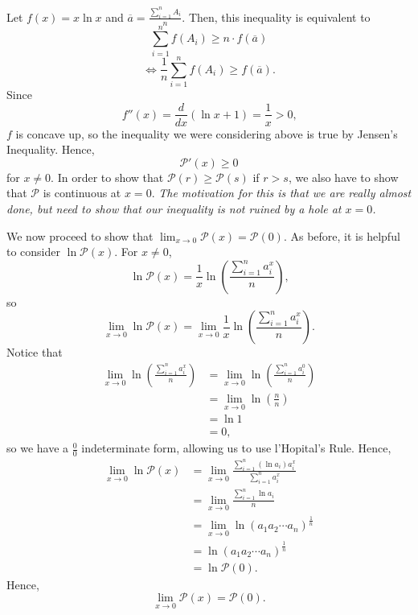 \documentclass{article}
\begin{document}
Let $f(x) = x \ln x$ and $\overline{a} = \frac{\sum_{i=1}^n A_i}{n}$. Then, this inequality is equivalent to
\[
\sum_{i=1}^n f(A_i) \geq n \cdot f(\overline{a})
\]
\[
    \iff \frac{1}{n} \sum_{i=1}^n f(A_i) \geq f(\overline{a}) \text{.}
\]
Since
\[
    f''(x) = \frac{d}{dx} (\ln x + 1) = \frac{1}{x} > 0 \text{,}
\]
$f$ is concave up, so the inequality we were considering above is true by Jensen's Inequality. Hence,
\[
    \mathcal{P}'(x) \geq 0
\]
for $x \neq 0$. In order to show that $\mathcal{P}(r) \geq \mathcal{P}(s)$ if $r > s$, we also have to show that $\mathcal{P}$ is continuous at $x = 0$. \textit{The motivation for this is that we are really almost done, but need to show that our inequality is not ruined by a hole at $x = 0$.}
\bigskip

We now proceed to show that $\lim_{x \rightarrow 0} \mathcal{P}(x) = \mathcal{P}(0)$. As before, it is helpful to consider $\ln \mathcal{P}(x)$. For $x \neq 0$,
\[
    \ln \mathcal{P}(x) = \frac{1}{x} \ln \left( \frac{\sum_{i=1}^n a_i^x}{n} \right) \text{,}
\]
so
\[
    \lim_{x \rightarrow 0} \ln \mathcal{P}(x) = \lim_{x \rightarrow 0} \frac{1}{x} \ln \left( \frac{\sum_{i=1}^n a_i^x}{n} \right) \text{.}
\]
Notice that
\begin{equation*}
    \begin{split}
        \lim_{x \rightarrow 0} \ln \left( \frac{\sum_{i=1}^n a_i^x}{n} \right) &= \lim_{x \rightarrow 0} \ln \left( \frac{\sum_{i=1}^n a_i^0}{n} \right) \\ 
        &= \lim_{x \rightarrow 0} \ln \left( \frac{n}{n} \right) \\
        &= \ln 1 \\
        &= 0 \text{,}
    \end{split}
\end{equation*}
so we have a $\frac{0}{0}$ indeterminate form, allowing us to use l'Hopital's Rule. Hence,
\begin{equation*}
    \begin{split}
        \lim_{x \rightarrow 0} \ln \mathcal{P}(x) &= \lim_{x \rightarrow 0} \frac{\sum_{i=1}^n (\ln a_i)a_i^x}{\sum_{i=1}^n a_i^x} \\
        &= \lim_{x \rightarrow 0} \frac{\sum_{i=1}^n \ln a_i}{n} \\
        &= \lim_{x \rightarrow 0} \ln (a_1 a_2 \cdots a_n)^\frac{1}{n} \\
        &= \ln (a_1 a_2 \cdots a_n)^\frac{1}{n} \\
        &= \ln \mathcal{P}(0) \text{.}
    \end{split}
\end{equation*}
Hence,
\[
    \lim_{x \rightarrow 0} \mathcal{P}(x) = \mathcal{P}(0) \text{.}
\]
\end{document}
